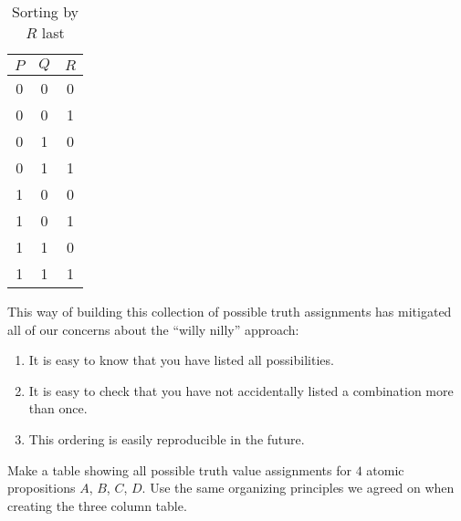 \begin{table}[h!]
	\begin{center}
		\caption{Sorting by $R$ last}
		\begin{tabular}{c|c|c} 
			$P$ & $Q$ & $R$ \\
			\hline
			0 & 0 & 0  \\  \hline
			0 & 0 & 1 \\  \hline
			0 & 1 & 0 \\  \hline
			0 & 1 & 1 \\  \hline
			1 & 0 & 0 \\  \hline
			1 & 0 &  1\\  \hline
			1 & 1 &  0\\  \hline
			1 & 1  &  1 \\  \hline
		\end{tabular}
	\end{center}
\end{table}

This way of building this collection of possible truth assignments has mitigated all of our concerns about the ``willy nilly'' approach:

\begin{enumerate}
	\item It is easy to know that you have listed all possibilities.
	\item It is easy to check that you have not accidentally listed a combination more than once.
	\item This ordering is easily reproducible in the future.
\end{enumerate}


\begin{xca}
	
	Make a table showing all possible truth value assignments for $4$ atomic propositions $A$, $B$, $C$, $D$.  Use the same organizing principles we agreed on when creating the three column table.
	
\end{xca}

